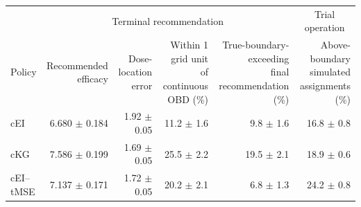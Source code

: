 \begin{tabular}{lrrrrr}
\toprule
 & \multicolumn{4}{c}{Terminal recommendation} & \multicolumn{1}{c}{Trial operation} \\
\cmidrule(lr){2-5}\cmidrule(lr){6-6}
Policy & \shortstack{Recommended\\efficacy} & \shortstack{Dose-location\\error} & \shortstack{Within 1 grid unit\\of continuous OBD (\%)} & \shortstack{True-boundary-exceeding\\final recommendation (\%)} & \shortstack{Above-boundary\\simulated assignments (\%)} \\
\midrule
cEI & 6.680 $\pm$ 0.184 & 1.92 $\pm$ 0.05 & 11.2 $\pm$ 1.6 & 9.8 $\pm$ 1.6 & 16.8 $\pm$ 0.8 \\
cKG & 7.586 $\pm$ 0.199 & 1.69 $\pm$ 0.05 & 25.5 $\pm$ 2.2 & 19.5 $\pm$ 2.1 & 18.9 $\pm$ 0.6 \\
cEI--tMSE & 7.137 $\pm$ 0.171 & 1.72 $\pm$ 0.05 & 20.2 $\pm$ 2.1 & 6.8 $\pm$ 1.3 & 24.2 $\pm$ 0.8 \\
\bottomrule
\end{tabular}
